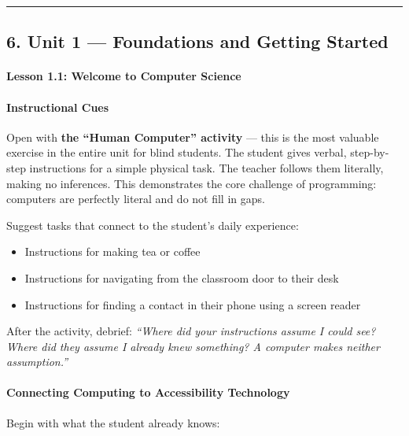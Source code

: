 \documentclass[
  justified,
  openright,
]{tufte-book}
\let\subsubsection\paragraph
\let\paragraph\paragraph
\let\subsubsection\paragraph
\let\paragraph\paragraph
\providecommand{\tightlist}{%
  \setlength{\itemsep}{0pt}\setlength{\parskip}{0pt}}
\begin{document}
\begin{center}\rule{0.5\linewidth}{0.5pt}\end{center}

\subsection{6. Unit 1 --- Foundations and Getting
Started}\label{unit-1-foundations-and-getting-started}

\subsubsection{Lesson 1.1: Welcome to Computer
Science}\label{lesson-1.1-welcome-to-computer-science}

\paragraph{Instructional Cues}\label{instructional-cues-2}

Open with \textbf{the ``Human Computer'' activity} --- this is the most
valuable exercise in the entire unit for blind students. The student
gives verbal, step-by-step instructions for a simple physical task. The
teacher follows them literally, making no inferences. This demonstrates
the core challenge of programming: computers are perfectly literal and
do not fill in gaps.

Suggest tasks that connect to the student's daily experience:

\begin{itemize}
\tightlist
\item
  Instructions for making tea or coffee
\item
  Instructions for navigating from the classroom door to their desk
\item
  Instructions for finding a contact in their phone using a screen
  reader
\end{itemize}

After the activity, debrief: \emph{``Where did your instructions assume
I could see? Where did they assume I already knew something? A computer
makes neither assumption.''}

\paragraph{Connecting Computing to Accessibility
Technology}\label{connecting-computing-to-accessibility-technology}

Begin with what the student already knows:
\end{document}
